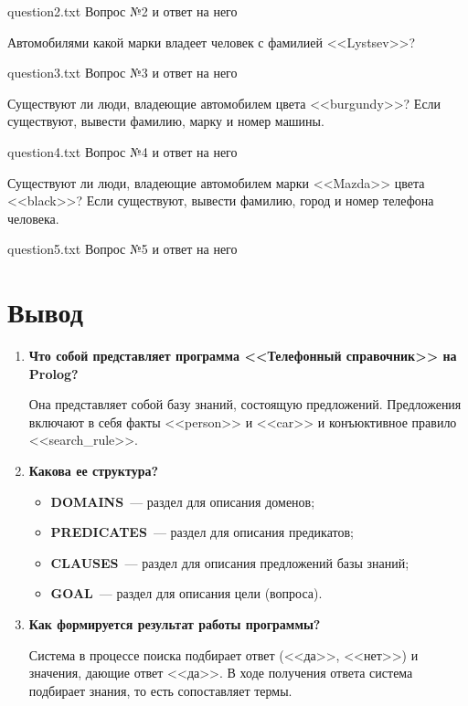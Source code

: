 {question2.txt} %
{Вопрос №2 и ответ на него} %

Автомобилями какой марки владеет человек с фамилией <<Lystsev>>?

{question3.txt} %
{Вопрос №3 и ответ на него} %

Существуют ли люди, владеющие автомобилем цвета <<burgundy>>? Если существуют, вывести фамилию, марку и номер машины.

{question4.txt} %
{Вопрос №4 и ответ на него} %

\clearpage

Существуют ли люди, владеющие автомобилем марки <<Mazda>> цвета <<black>>? Если существуют, вывести фамилию, город и номер телефона человека.


{question5.txt} %
{Вопрос №5 и ответ на него} %

\section*{Вывод}

\begin{enumerate}
	\item \textbf{Что собой представляет программа <<Телефонный справочник>> на Prolog?}
	
	Она представляет собой базу знаний, состоящую предложений. Предложения включают в себя факты <<person>> и <<car>> и конъюктивное правило <<search\_rule>>.
	
	\item \textbf{Какова ее структура?}
	
	\begin{itemize}[label*=--]
		\item \textbf{DOMAINS}~--- раздел для описания доменов;
		\item \textbf{PREDICATES}~--- раздел для описания предикатов;
		\item \textbf{CLAUSES}~--- раздел для описания предложений базы знаний;
		\item \textbf{GOAL}~--- раздел для описания цели (вопроса).
	\end{itemize}
	
	\item \textbf{Как формируется результат работы программы?}
	
	Система в процессе поиска подбирает ответ (<<да>>, <<нет>>) и значения, дающие ответ <<да>>. В ходе получения ответа система подбирает знания, то есть сопоставляет термы.
	
\end{enumerate}